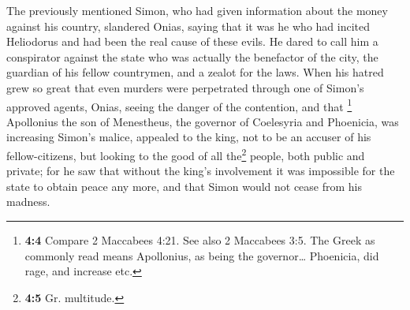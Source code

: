  The previously mentioned Simon, who had given information
about the money against his country, slandered Onias, saying that it was
he who had incited Heliodorus and had been the real cause of these
evils.  He dared to call him a conspirator against the
state who was actually the benefactor of the city, the guardian of his
fellow countrymen, and a zealot for the laws.  When his
hatred grew so great that even murders were perpetrated through one of
Simon's approved agents,  Onias, seeing the danger of the
contention, and that \footnote{\textbf{4:4} Compare 2 Maccabees 4:21.
  See also 2 Maccabees 3:5. The Greek as commonly read means Apollonius,
  as being the governor\ldots{} Phoenicia, did rage, and increase etc.}
Apollonius the son of Menestheus, the governor of Coelesyria and
Phoenicia, was increasing Simon's malice,  appealed to the
king, not to be an accuser of his fellow-citizens, but looking to the
good of all the\footnote{\textbf{4:5} Gr. multitude.} people, both
public and private;  for he saw that without the king's
involvement it was impossible for the state to obtain peace any more,
and that Simon would not cease from his madness.

